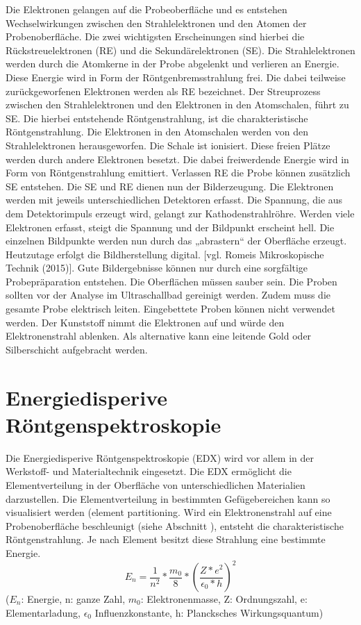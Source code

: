 \documentclass[a4paper, 11pt]{tubsreprt}
\begin{document}
Die Elektronen gelangen auf die Probeoberfläche und es entstehen Wechselwirkungen zwischen den Strahlelektronen und den Atomen der Probenoberfläche. Die zwei wichtigsten Erscheinungen sind hierbei die Rückstreuelektronen (RE) und die Sekundärelektronen (SE). Die Strahlelektronen werden durch die Atomkerne in der Probe abgelenkt  und verlieren an Energie. Diese Energie wird in Form der Röntgenbremsstrahlung frei. Die dabei teilweise zurückgeworfenen Elektronen werden als RE bezeichnet. Der Streuprozess zwischen den Strahlelektronen und den Elektronen in den Atomschalen, führt zu SE. Die hierbei entstehende Röntgenstrahlung, ist die charakteristische Röntgenstrahlung. Die Elektronen in den Atomschalen werden von den Strahlelektronen herausgeworfen. Die Schale ist ionisiert. Diese freien Plätze werden durch andere Elektronen besetzt. Die dabei freiwerdende Energie wird in Form von Röntgenstrahlung emittiert. Verlassen RE die Probe können zusätzlich SE entstehen.
Die SE und RE dienen nun der Bilderzeugung. Die Elektronen werden mit jeweils unterschiedlichen Detektoren erfasst. Die Spannung, die aus dem Detektorimpuls erzeugt wird, gelangt zur Kathodenstrahlröhre. Werden viele Elektronen erfasst, steigt die Spannung und der Bildpunkt erscheint hell. Die einzelnen Bildpunkte werden nun durch das „abrastern“ der Oberfläche erzeugt. Heutzutage erfolgt die Bildherstellung digital. [vgl. Romeis Mikroskopische Technik (2015)].
Gute Bildergebnisse können nur durch eine sorgfältige Probepräparation entstehen. Die Oberflächen müssen sauber sein. Die Proben sollten vor der Analyse im Ultraschallbad gereinigt werden.  Zudem muss die gesamte Probe elektrisch leiten. Eingebettete Proben können nicht verwendet werden. Der Kunststoff nimmt die Elektronen auf und würde den Elektronenstrahl ablenken. Als alternative kann eine leitende Gold oder Silberschicht aufgebracht werden.

\section{Energiedisperive Röntgenspektroskopie}
Die Energiedisperive Röntgenspektroskopie (EDX) wird vor allem in der Werkstoff- und Materialtechnik eingesetzt. Die EDX ermöglicht die Elementverteilung in der Oberfläche von unterschiedlichen Materialien  darzustellen. Die Elementverteilung in bestimmten Gefügebereichen kann so visualisiert werden (element partitioning.
Wird ein Elektronenstrahl auf eine Probenoberfläche beschleunigt (siehe Abschnitt   ), entsteht die charakteristische Röntgenstrahlung. Je nach Element besitzt diese Strahlung eine bestimmte Energie. 
\begin{equation}\label{EDX formel}
E_{ n }=\frac{ 1 }{n^{ 2 }}*\frac{m_{0}}{8}*\left(  \frac{Z*e^{2}}{ \epsilon_{0}*h}\right)^{ 2 }
\end{equation}
($E_{n}$: Energie, n: ganze Zahl, $m_{0}$: Elektronenmasse, Z: Ordnungszahl, e: Elementarladung, $\epsilon_{0}$ Influenzkonstante, h: Plancksches Wirkungsquantum)   
\end{document}
